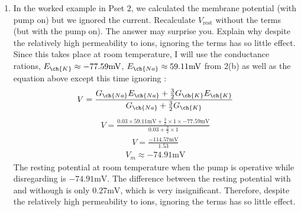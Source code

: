 \documentclass[11pt]{article}
\begin{document}
\begin{enumerate}[label=\arabic*.]
\begin{enumerate}[label=(\alph*)]
\newpage
\item
In the worked example in Pset $2$, we calculated the membrane potential (with pump on) but we ignored the  current. Recalculate $V_{\text{rest}}$ without the  terms (but with the pump on). The answer may surprise you. Explain why despite the relatively high permeability to  ions, ignoring the  terms has so little effect.
\vspace*{1\baselineskip}
\\
Since this takes place at room temperature, I will use the conductance rations, $E_{\ch{K}} \approx -77.59 \text{mV}$, $E_{\ch{Na}} \approx 59.11 \text{mV}$ from $2$(b) as well as the equation above except this time ignoring :
\begin{align*}
V = \frac{G_{\ch{Na}} E_{\ch{Na}} + \frac{3} {2} G_{\ch{K}} E_{\ch{K}}} {G_{\ch{Na}} + \frac{3} {2} G_{\ch{K}}}
\end{align*}
\begin{align*}
V = \frac{0.03 \times 59.11 \text{mV} + \frac{3} {2} \times 1 \times -77.59 \text{mV}} {0.03 + \frac{3} {2} \times 1}
\end{align*}
\begin{align*}
V = \frac{-114.57 \text{mV}} {1.53}
\end{align*}
\begin{align*}
V_m \approx -74.91 \text{mV}
\end{align*}
The resting potential at room temperature when the pump is operative while disregarding  is $-74.91 \text{mV}$. The difference between the resting potential with and withough  is only $0.27 \text{mV}$, which is very insignificant. Therefore, despite the relatively high permeability to  ions, ignoring the  terms has so little effect.
\end{enumerate}




\end{enumerate}
\end{document}
